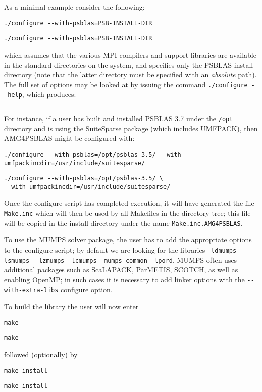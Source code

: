As a minimal example consider the following:
\ifpdf
\begin{verbatim}
./configure --with-psblas=PSB-INSTALL-DIR
\end{verbatim}
\else
\begin{verbatim}
./configure --with-psblas=PSB-INSTALL-DIR
\end{verbatim}
\fi
which assumes that the various MPI compilers and support libraries are
available in the standard directories on the system, and specifies
only the PSBLAS install  directory (note that the latter directory must
be specified with an {\em absolute} path).
The full set of options may be looked at by issuing the command
\verb|./configure --help|, which produces:
\ifpdf
\inputminted[breaklines=true,bgcolor=bg,fontsize=\small]{console}{../configureout.txt}
\else

\fi
For instance, if a user has built and installed PSBLAS 3.7 under the
\verb|/opt| directory and is
using the SuiteSparse package (which includes UMFPACK), then AMG4PSBLAS
might be configured with:
\ifpdf
\begin{verbatim}
./configure --with-psblas=/opt/psblas-3.5/ --with-umfpackincdir=/usr/include/suitesparse/
\end{verbatim}
\else
\begin{verbatim}
./configure --with-psblas=/opt/psblas-3.5/ \
--with-umfpackincdir=/usr/include/suitesparse/
\end{verbatim}
\fi
Once the configure script has completed execution, it will have
generated the file \verb|Make.inc| which will then be used by all
Makefiles in the directory tree; this file will be copied in the
install directory under the name \verb|Make.inc.AMG4PSBLAS|.

To use the MUMPS solver package,
the user has to add the appropriate options to the configure script;
by default we are looking for the libraries
\verb|-ldmumps -lsmumps| \verb| -lzmumps -lcmumps -mumps_common -lpord|.
MUMPS often uses additional packages such as ScaLAPACK, ParMETIS,
SCOTCH, as well as enabling OpenMP; in such cases it is necessary to
add linker options with the \verb|--with-extra-libs| configure option.

To build the library the user will now enter
\ifpdf
\begin{verbatim}
make
\end{verbatim}
\else
\begin{verbatim}
make
\end{verbatim}
\fi
followed (optionally) by
\ifpdf
\begin{verbatim}
make install
\end{verbatim}
\else
\begin{verbatim}
make install
\end{verbatim}
\fi
